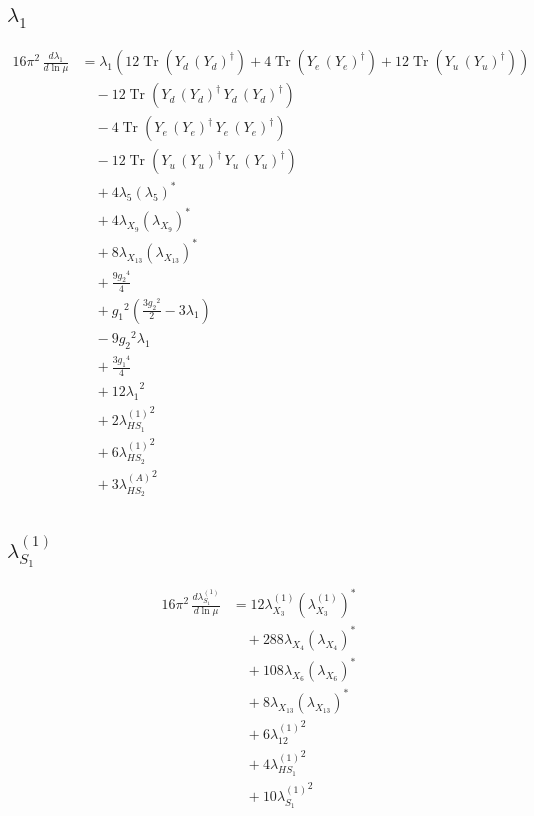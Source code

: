 \documentclass[10pt,a4paper]{article}
\begin{document}
\subsection*{$\lambda_1$}
\begin{align*}
16\pi^2\,\frac{d \lambda_1}{d\ln\mu} &={\lambda_1} (12 \operatorname{Tr}\!\left({Y_d}\,\left({Y_d}\right)^{\dagger}\right)+4 \operatorname{Tr}\!\left({Y_e}\,\left({Y_e}\right)^{\dagger}\right)+12 \operatorname{Tr}\!\left({Y_u}\,\left({Y_u}\right)^{\dagger}\right)) \\
&\quad -12 \operatorname{Tr}\!\left({Y_d}\,\left({Y_d}\right)^{\dagger}\,{Y_d}\,\left({Y_d}\right)^{\dagger}\right) \\
&\quad -4 \operatorname{Tr}\!\left({Y_e}\,\left({Y_e}\right)^{\dagger}\,{Y_e}\,\left({Y_e}\right)^{\dagger}\right) \\
&\quad -12 \operatorname{Tr}\!\left({Y_u}\,\left({Y_u}\right)^{\dagger}\,{Y_u}\,\left({Y_u}\right)^{\dagger}\right) \\
&\quad +4 {\lambda_5} \left({\lambda_5}\right)^{*} \\
&\quad +4 {\lambda_{X_{9}}} \left({\lambda_{X_{9}}}\right)^{*} \\
&\quad +8 {\lambda_{X_{13}}} \left({\lambda_{X_{13}}}\right)^{*} \\
&\quad +\frac{9 {g_2}^4}{4} \\
&\quad +{g_1}^2 \left(\frac{3 {g_2}^2}{2}-3 {\lambda_1}\right) \\
&\quad -9 {g_2}^2 {\lambda_1} \\
&\quad +\frac{3 {g_1}^4}{4} \\
&\quad +12 {\lambda_1}^2 \\
&\quad +2 {\lambda_{HS_1}^{(1)}}^2 \\
&\quad +6 {\lambda_{HS_2}^{(1)}}^2 \\
&\quad +3 {\lambda_{HS_2}^{(A)}}^2 \\
\end{align*}
\subsection*{$\lambda_{S_1}^{(1)}$}
\begin{align*}
16\pi^2\,\frac{d \lambda_{S_1}^{(1)}}{d\ln\mu} &=12 {\lambda_{X_{3}}^{(1)}} \left({\lambda_{X_{3}}^{(1)}}\right)^{*} \\
&\quad +288 {\lambda_{X_{4}}} \left({\lambda_{X_{4}}}\right)^{*} \\
&\quad +108 {\lambda_{X_{6}}} \left({\lambda_{X_{6}}}\right)^{*} \\
&\quad +8 {\lambda_{X_{13}}} \left({\lambda_{X_{13}}}\right)^{*} \\
&\quad +6 {\lambda_{12}^{(1)}}^2 \\
&\quad +4 {\lambda_{HS_1}^{(1)}}^2 \\
&\quad +10 {\lambda_{S_1}^{(1)}}^2 \\
\end{align*}
\end{document}
